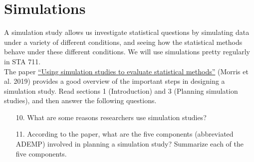 \documentclass[11pt]{article}
\begin{document}
\section{Simulations}

A simulation study allows us investigate statistical questions by simulating data under a variety of different conditions, and seeing how the statistical methods behave under these different conditions. We will use simulations pretty regularly in STA 711.\\

\noindent The paper \href{https://onlinelibrary.wiley.com/doi/10.1002/sim.8086}{“Using simulation studies to evaluate statistical methods”} (Morris et al. 2019) provides a good overview of the important steps in designing a simulation study. Read sections 1 (Introduction) and 3 (Planning simulation studies), and then answer the following questions.

\begin{enumerate}
\item[10.] What are some reasons researchers use simulation studies?

\item[11.] According to the paper, what are the five components (abbreviated ADEMP) involved in planning a simulation study? Summarize each of the five components.
\end{enumerate}
\end{document}
